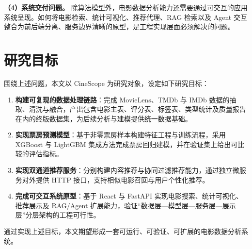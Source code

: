 \textbf{（4）系统交付问题。} 除算法模型外，电影数据分析能力还需要通过可交互的应用系统呈现。如何将电影检索、统计可视化、推荐代理、RAG 检索以及 Agent 交互整合为前后端分离、服务边界清晰的原型，是工程实现层面必须解决的问题。

\section{研究目标}
\label{sec:intro:objective}

围绕上述问题，本文以 CineScope 为研究对象，设定如下研究目标：

\begin{enumerate}
    \item \textbf{构建可复现的数据处理链路}：完成 MovieLens、TMDb 与 IMDb 数据的抽取、清洗与融合，产出包含电影主表、评分表、标签表、类型统计及质量报告在内的终版数据集，为后续分析与建模提供统一数据基础。
    \item \textbf{实现票房预测模型}：基于非零票房样本构建特征工程与训练流程，采用 XGBoost 与 LightGBM 集成方法完成票房回归建模，并在验证集上给出可比较的评估指标。
    \item \textbf{实现双通道推荐服务}：分别构建内容推荐与协同过滤推荐能力，通过独立微服务对外提供 HTTP 接口，支持相似电影召回与用户个性化推荐。
    \item \textbf{完成可交互系统原型}：基于 React 与 FastAPI 实现电影搜索、统计可视化、推荐展示及 RAG/Agent 扩展能力，验证“数据层—模型层—服务层—展示层”分层架构的工程可行性。
\end{enumerate}

通过实现上述目标，本文期望形成一套可运行、可验证、可扩展的电影数据分析系统。
